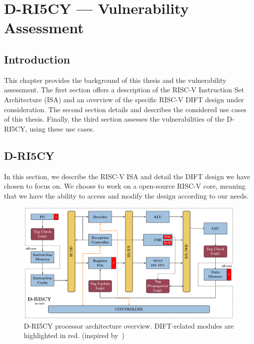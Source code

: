 \chapter{D-RI5CY — Vulnerability Assessment}
\label{chapter:dift_assessment}
\minitoc

\section{Introduction}
This chapter provides the background of this thesis and the vulnerability assessment. The first section offers a description of the RISC-V Instruction Set Architecture (ISA) and an overview of the specific RISC-V DIFT design under consideration.
The second section details and describes the considered use cases of this thesis.
Finally, the third section assesses the vulnerabilities of the D-RI5CY, using these use cases.

\section{D-RI5CY}
\label{section:driscy}
In this section, we describe the RISC-V ISA and detail the DIFT design we have chosen to focus on.
We choose to work on a open-source RISC-V core, meaning that we have the ability to access and modify the design according to our needs.

\begin{figure}[t]
    \centering
    \includegraphics[width=\textwidth]{c3_vulnerabilities_assessment/img/RI5CY.pdf}
    \caption{D-RI5CY processor architecture overview. DIFT-related modules are highlighted in red. (inspired by~\cite{PDGLC-18-hpec})}
    \label{fig:driscy}
\end{figure}

